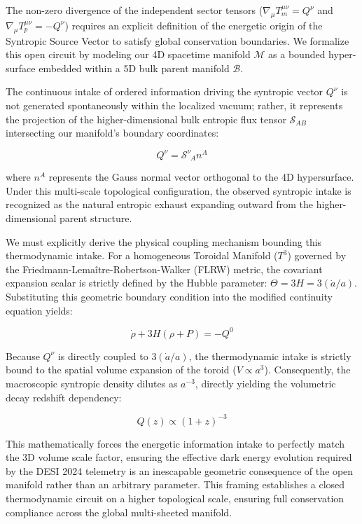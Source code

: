 \documentclass[aps,prd,10pt,onecolumn,superscriptaddress,nofootinbib]{revtex4-2}
\begin{document}
The non-zero divergence of the independent sector tensors ($\nabla_{\mu}T_{m}^{\mu\nu} = Q^{\nu}$ and $\nabla_{\mu}T_{p}^{\mu\nu} = -Q^{\nu}$) requires an explicit definition of the energetic origin of the Syntropic Source Vector to satisfy global conservation boundaries. We formalize this open circuit by modeling our 4D spacetime manifold $\mathcal{M}$ as a bounded hyper-surface embedded within a 5D bulk parent manifold $\mathcal{B}$. 

The continuous intake of ordered information driving the syntropic vector $Q^\nu$ is not generated spontaneously within the localized vacuum; rather, it represents the projection of the higher-dimensional bulk entropic flux tensor $\mathcal{S}_{AB}$ intersecting our manifold's boundary coordinates:

\begin{equation}
Q^{\nu} = \mathcal{S}^{\nu}_{\ \ A} n^{A}
\end{equation}

where $n^{A}$ represents the Gauss normal vector orthogonal to the 4D hypersurface. Under this multi-scale topological configuration, the observed syntropic intake is recognized as the natural entropic exhaust expanding outward from the higher-dimensional parent structure. 

We must explicitly derive the physical coupling mechanism bounding this thermodynamic intake. For a homogeneous Toroidal Manifold ($T^3$) governed by the Friedmann-Lemaître-Robertson-Walker (FLRW) metric, the covariant expansion scalar is strictly defined by the Hubble parameter: $\Theta = 3H = 3(\dot{a}/a)$. Substituting this geometric boundary condition into the modified continuity equation yields:

\begin{equation}
\dot{\rho} + 3H(\rho + P) = -Q^0
\end{equation}

Because $Q^\nu$ is directly coupled to $3(\dot{a}/a)$, the thermodynamic intake is strictly bound to the spatial volume expansion of the toroid ($V \propto a^3$). Consequently, the macroscopic syntropic density dilutes as $a^{-3}$, directly yielding the volumetric decay redshift dependency:

\begin{equation} \label{eq:syntropic_decay}
Q(z) \propto (1+z)^{-3}
\end{equation}

This mathematically forces the energetic information intake to perfectly match the 3D volume scale factor, ensuring the effective dark energy evolution required by the DESI 2024 telemetry is an inescapable geometric consequence of the open manifold rather than an arbitrary parameter. This framing establishes a closed thermodynamic circuit on a higher topological scale, ensuring full conservation compliance across the global multi-sheeted manifold.
\end{document}
